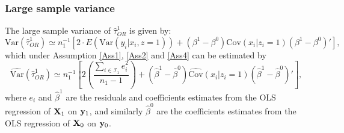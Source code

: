 \documentclass[11pt]{article}
\newcommand{\Var}{{\mbox{Var}}}
\newcommand{\Cov}{{\mbox{Cov}}}
\newcommand{\X}{{\bf X}}
\newcommand{\y}{{\bf y}}
\begin{document}
\subsubsection*{Large sample variance}
The large sample variance of $\hat \tau_{OR}^1$ is given by:
$$\mbox{Var}(\hat \tau_{OR}^1) \simeq n_1^{-1} \left[2 \cdot E\left(\mbox{Var}(y_i|x_i, z=1)\right) +(\beta^1-\beta^0)\mbox{Cov}\left(x_i|z_i=1\right)(\beta^1-\beta^0)' \right],$$
which under Assumption \ref{Ass1}, \ref{Ass2} and \ref{Ass4} can be estimated by
$$\widehat\Var(\hat \tau_{OR}^1) \simeq n_1^{-1} \left[2 \left(\frac{\sum \limits_{i \in \mathcal{I}_1}e_i^2}{n_1-1} \right) +(\hat \beta^1-\hat \beta^0)\widehat{\Cov}\left(x_i|z_i=1\right)(\hat \beta^1-\hat \beta^0)' \right],$$
where $e_i$ and $\hat \beta^1$ are the residuals and coefficients estimates from the OLS regression of $\X_1$ on $\y_1$, and similarly $\hat \beta^0$ are the coefficients estimates from the OLS regression of $\X_0$ on $\y_0$.
\end{document}
